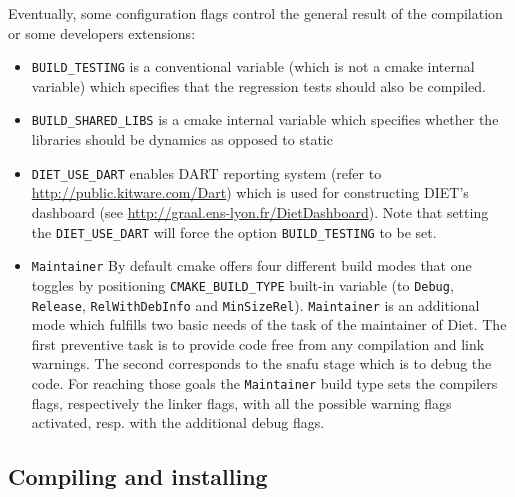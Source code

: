 Eventually, some configuration flags control the general result of the
compilation or some developers extensions:
\begin{itemize}
\item
  \verb+BUILD_TESTING+ is a conventional variable (which is not a cmake
  internal variable) which specifies that the regression tests should
  also be compiled.

\item
  \verb+BUILD_SHARED_LIBS+ is a cmake internal variable which specifies
  whether the libraries should be dynamics as opposed to static

\item
  \verb+DIET_USE_DART+ enables DART reporting system (refer to 
  \url{http://public.kitware.com/Dart}) which is used for constructing
  DIET's dashboard (see \url{http://graal.ens-lyon.fr/DietDashboard}).
  Note that setting the \verb+DIET_USE_DART+ will force the option
  \linebreak\verb+BUILD_TESTING+ to be set.

\item
  \verb+Maintainer+ By default cmake offers four different build modes
  that one toggles by positioning \verb+CMAKE_BUILD_TYPE+ built-in
  variable (to \verb+Debug+, \verb+Release+, \verb+RelWithDebInfo+
  and \verb+MinSizeRel+).
  \verb+Maintainer+ is an additional mode which fulfills two basic needs
  of the task of the maintainer of Diet.
  The first preventive task is to provide code free from any compilation
  and link warnings.
  The second corresponds to the snafu stage which is to debug the code.
  For reaching those goals the \verb+Maintainer+ build type sets the
  compilers flags, respectively the linker flags, with all the possible
  warning flags activated, resp. with the additional debug flags.
\end{itemize}

\subsection{Compiling and installing}

